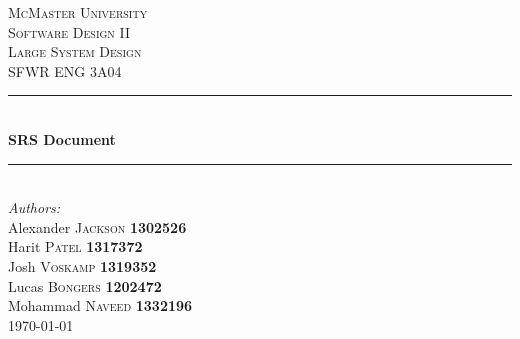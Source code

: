 \documentclass[]{article}
\begin{document}
\cleardoublepage
{}
\begin{titlepage}
	\newcommand{\HRule}{\rule{\linewidth}{0.5mm}} %
	\center %


	\textsc{\LARGE McMaster University}\\[1.5cm] %
	\textsc{\Large Software Design II \\  \Large Large System Design}\\[0.5cm] %
	\textsc{\large SFWR ENG 3A04}\\[0.5cm] %


	\HRule \\[0.4cm]
	{ \huge \bfseries SRS Document}\\[0.4cm] %
	\HRule \\[1.5cm]


	\Large \emph{Authors:}\\
	Alexander \textsc{Jackson} \textbf{1302526} \\
	Harit \textsc{Patel} \textbf{1317372} \\ %
	Josh \textsc{Voskamp} \textbf{1319352} \\
	Lucas \textsc{Bongers} \textbf{1202472} \\
	Mohammad \textsc{Naveed} \textbf{1332196} \\[3cm]

	{\large \today}\\[3cm] %

	\vfill %

\end{titlepage}
\end{document}
